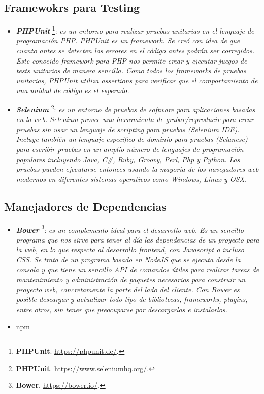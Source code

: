 \documentclass[11pt,oneside]{book}
\begin{document}
\subsection{Framewokrs para Testing}
\begin{itemize}
\item \textit{\textbf{PHPUnit}} \footnote{\textbf{PHPUnit}. \url{https://phpunit.de/}.}: \textit{es un entorno para realizar pruebas unitarias en el lenguaje de programación PHP. PHPUnit es un framework. Se creó con idea de que cuanto antes se detecten los errores en el código antes podrán ser corregidos. Este conocido framework para PHP nos permite crear y ejecutar juegos de tests unitarios de manera sencilla. Como todos los frameworks de pruebas unitarias, PHPUnit utiliza \textit{assertions} para verificar que el comportamiento de una unidad de código es el esperado.}

\item \textit{\textbf{Selenium}} \footnote{\textbf{PHPUnit}. \url{https://www.seleniumhq.org/}.}: \textit{es un entorno de pruebas de software para aplicaciones basadas en la web. Selenium provee una herramienta de grabar/reproducir para crear pruebas sin usar un lenguaje de scripting para pruebas (Selenium IDE). Incluye también un lenguaje específico de dominio para pruebas (Selanese) para escribir pruebas en un amplio número de lenguajes de programación populares incluyendo Java, C\#, Ruby, Groovy, Perl, Php y Python. Las pruebas pueden ejecutarse entonces usando la mayoría de los navegadores web modernos en diferentes sistemas operativos como Windows, Linux y OSX.}
\end{itemize}

\subsection{Manejadores de Dependencias}
\begin{itemize}
\item \textit{\textbf{Bower}} \footnote{\textbf{Bower}. \url{https://bower.io/}.}: \textit{es un complemento ideal para el desarrollo web. Es un sencillo programa que nos sirve para tener al día las dependencias de un proyecto para la web, en lo que respecta al desarrollo frontend, con Javascript o incluso CSS. Se trata de un programa basado en NodeJS que se ejecuta desde la consola y que tiene un sencillo API de comandos útiles para realizar tareas de mantenimiento y administración de paquetes necesarios para construir un proyecto web, concretamente la parte del lado del cliente. Con Bower es posible descargar y actualizar todo tipo de bibliotecas, frameworks, plugins, entre otros, sin tener que preocuparse por descargarlos e instalarlos.}
\item npm
\end{itemize}
\end{document}

